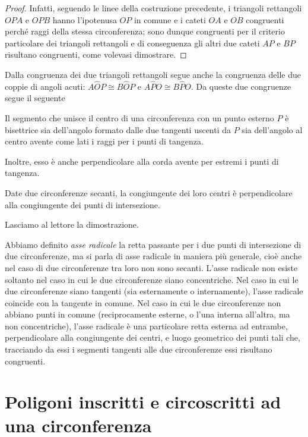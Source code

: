\begin{proof}
Infatti, seguendo le linee della costruzione precedente, i triangoli rettangoli $OPA$ e $OPB$ hanno l'ipotenusa $OP$ in comune e i cateti $OA$ e $OB$ congruenti perché raggi della stessa circonferenza; sono dunque congruenti per il criterio particolare dei triangoli rettangoli e di conseguenza gli altri due cateti $AP$ e $BP$ risultano congruenti, come volevasi dimostrare.
\end{proof}

Dalla congruenza dei due triangoli rettangoli segue anche la congruenza delle due coppie di angoli acuti: $A\widehat{O}P\cong B\widehat{O}P$ e $A\widehat{P}O\cong B\widehat{P}O$. Da queste due congruenze segue il seguente 
\begin{corollario}
Il segmento che unisce il centro di una circonferenza con un punto esterno $P$ è bisettrice sia dell'angolo formato dalle due tangenti uscenti da $P$ sia dell'angolo al centro avente come lati i raggi per i punti di tangenza.
\end{corollario}
Inoltre, esso è anche perpendicolare alla corda avente per estremi i punti di tangenza.

\begin{corollario}
Date due circonferenze secanti, la congiungente dei loro centri è perpendicolare alla congiungente dei punti di intersezione.
\end{corollario}

Lasciamo al lettore la dimostrazione.

Abbiamo definito \emph{asse radicale} la retta passante per i due punti di intersezione di due circonferenze, ma si parla di asse radicale in maniera più generale, cioè anche nel caso di due circonferenze tra loro non sono secanti. L'asse radicale non esiste soltanto nel caso in cui le due circonferenze siano concentriche.
Nel caso in cui le due circonferenze siano tangenti (sia esternamente o internamente), l'asse radicale coincide con la tangente in comune.
Nel caso in cui le due circonferenze non abbiano punti in comune (reciprocamente esterne, o l'una interna all'altra, ma non concentriche), l'asse radicale è una particolare retta esterna ad entrambe, perpendicolare alla congiungente dei centri, e luogo geometrico dei punti tali che, tracciando da essi i segmenti tangenti alle due circonferenze essi risultano congruenti.


\section{Poligoni inscritti e circoscritti ad una circonferenza}

